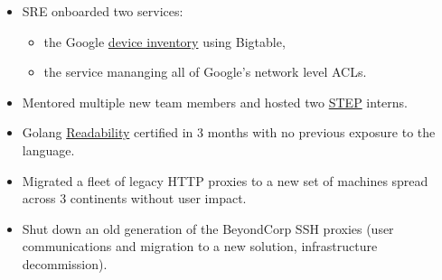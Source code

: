 \documentclass[a4paper,sans,colorlinks]{moderncv}
\begin{document}
{\begin{itemize}
\begin{itemize}
\end{itemize}
\item SRE onboarded two services:
\begin{itemize}
\item the Google \href{https://storage.googleapis.com/pub-tools-public-publication-data/pdf/44860.pdf}{device inventory} using Bigtable,
\item the service mananging all of Google's network level ACLs.
\end{itemize}
\item Mentored multiple new team members and hosted two
\href{https://careers.google.com/students/engineering-and-technical-internships/}{STEP} interns.
\item Golang \href{https://sback.it/publications/icse2018seip.pdf}{Readability} certified in 3 months with no previous exposure to the language.
\item Migrated a fleet of legacy HTTP proxies to a new set of machines spread across 3 continents without user impact.
\item Shut down an old generation of the BeyondCorp SSH proxies (user communications and migration to a new solution, infrastructure decommission).
\end{itemize}
}
\end{document}
